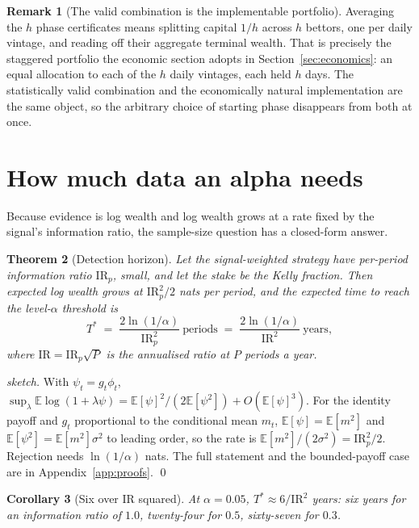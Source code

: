 \documentclass{article}
\theoremstyle{plain}
\newtheorem{theorem}{Theorem}
\newtheorem{corollary}[theorem]{Corollary}
\theoremstyle{definition}
\newtheorem{remark}[theorem]{Remark}
\begin{document}
\begin{remark}[The valid combination is the implementable portfolio]
\label{rem:stagger}
Averaging the $h$ phase certificates means splitting capital $1/h$ across $h$ bettors, one
per daily vintage, and reading off their aggregate terminal wealth. That is precisely the
staggered portfolio the economic section adopts in Section~\ref{sec:economics}: an equal
allocation to each of the $h$ daily vintages, each held $h$ days. The statistically valid
combination and the economically natural implementation are the same object, so the
arbitrary choice of starting phase disappears from both at once.
\end{remark}

\section{How much data an alpha needs}
\label{sec:design}

Because evidence is log wealth and log wealth grows at a rate fixed by the signal's
information ratio, the sample-size question has a closed-form answer.

\begin{theorem}[Detection horizon]
\label{thm:horizon}
Let the signal-weighted strategy have per-period information ratio $\mathrm{IR}_p$, small,
and let the stake be the Kelly fraction. Then expected log wealth grows at
$\mathrm{IR}_p^2/2$ nats per period, and the expected time to reach the level-$\alpha$
threshold is
\[
  T^\ast \;=\; \frac{2\ln(1/\alpha)}{\mathrm{IR}_p^{2}}\ \text{periods}
        \;=\; \frac{2\ln(1/\alpha)}{\mathrm{IR}^{2}}\ \text{years},
\]
where $\mathrm{IR}=\mathrm{IR}_p\sqrt{P}$ is the annualised ratio at $P$ periods a year.
\end{theorem}

\begin{proof}[sketch]
With $\psi_t=g_t\phi_t$, $\sup_\lambda\mathbb{E}\log(1+\lambda\psi)=
\mathbb{E}[\psi]^2/(2\mathbb{E}[\psi^2])+O(\mathbb{E}[\psi]^3)$. For the identity payoff
and $g_t$ proportional to the conditional mean $m_t$, $\mathbb{E}[\psi]=\mathbb{E}[m^2]$ and
$\mathbb{E}[\psi^2]=\mathbb{E}[m^2]\sigma^2$ to leading order, so the rate is
$\mathbb{E}[m^2]/(2\sigma^2)=\mathrm{IR}_p^2/2$. Rejection needs $\ln(1/\alpha)$ nats.
The full statement and the bounded-payoff case are in Appendix~\ref{app:proofs}. \qed
\end{proof}

\begin{corollary}[Six over IR squared]
\label{cor:six}
At $\alpha=0.05$, $T^\ast\approx 6/\mathrm{IR}^2$ years: six years for an information ratio
of $1.0$, twenty-four for $0.5$, sixty-seven for $0.3$.
\end{corollary}
\end{document}
